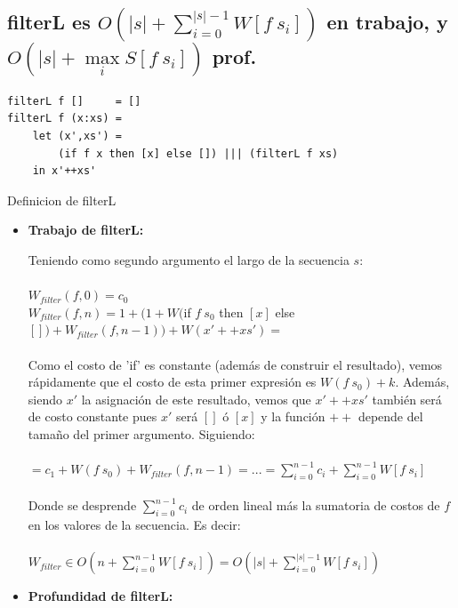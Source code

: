 \documentclass[12pt]{article}
\begin{document}
\subsection{filterL es $O(|s| + \sum\limits_{i=0}^{|s|-1} W[f\ s_i])$ en trabajo, y $O(|s| + \max\limits_{i} S[f\ s_i] )$ prof.}

\begin{table}[h]
\begin{lstlisting}
filterL f []     = []
filterL f (x:xs) = 
    let (x',xs') = 
        (if f x then [x] else []) ||| (filterL f xs) 
    in x'++xs'
\end{lstlisting}
\caption{Definicion de filterL}
\end{table}
\begin{itemize}

\item \textbf{Trabajo de filterL:}

Teniendo como segundo argumento el largo de la secuencia $s$: \\
\\
    $W_{filter}(f, 0) = c_0$ \\
    $W_{filter}(f, n) = 1 + ( 1 + W($if $f\ s_0$ then $[x]$ else $[]) + W_{filter}(f, n-1) ) + W(x'++xs') = $ \\
\\
    Como el costo de 'if' es constante (además de construir el resultado), vemos rápidamente que el costo de esta primer expresión es $W(f\ s_0) + k$.
    Además, siendo $x'$ la asignación de este resultado, vemos que $x'++xs'$ también será de costo constante pues $x'$ será $[]$ ó $[x]$ y la función $++$ depende del tamaño del primer argumento. Siguiendo:\\
\\
    $ = c_1 + W(f\ s_0) + W_{filter}(f, n-1) = ... = \sum\limits_{i=0}^{n-1} c_i + \sum\limits_{i=0}^{n-1} W[f\ s_i] $ \\
\\
    Donde se desprende $\sum\limits_{i=0}^{n-1} c_i$ de orden lineal más la sumatoria de costos de $f$ en los valores de la secuencia. Es decir: \\
\\
    $W_{filter} \in O(n + \sum\limits_{i=0}^{n-1} W[f\ s_i] ) = O(|s| + \sum\limits_{i=0}^{|s|-1} W[f\ s_i])$\\

\item \textbf{Profundidad de filterL:}


\end{itemize}
\end{document}
